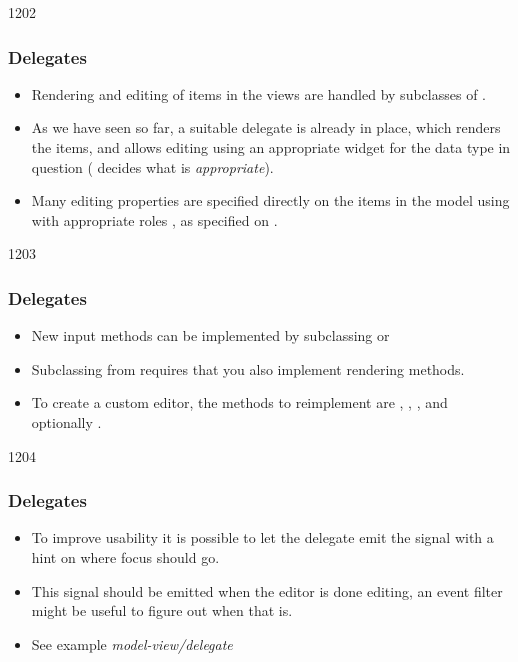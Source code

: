 \begin{slide}[fragile]{1202}\frametitle{Delegates}\label{model_view_delegates}
\begin{itemize}
\item Rendering and editing of items in the views are handled by subclasses
  of .
\item As we have seen so far, a suitable delegate is already in place,
  which renders the items, and allows editing using an appropriate widget
  for the data type in question ( decides what
  is \emph{appropriate}).
\item Many editing properties are specified directly on the items in the
  model using  with appropriate
  roles%
, as specified on .%
\end{itemize}
\end{slide}

\begin{slide}{1203}\frametitle{Delegates}
\begin{itemize}
\item New input methods can be implemented by subclassing
   or 
\item Subclassing from  requires that you
  also implement rendering methods.
\item To create a custom editor, the methods to reimplement are ,
  , , and optionally
  .
\end{itemize}
\end{slide}

\begin{slide}{1204}\frametitle{Delegates}
\begin{itemize}
\item To improve usability it is possible to let the delegate emit the
  signal  with a hint on where focus should go.
\item This signal should be emitted when the editor is done editing, an
  event filter might be useful to figure out when that is.
\item See example \emph{model-view/delegate}
\end{itemize}
\end{slide}


